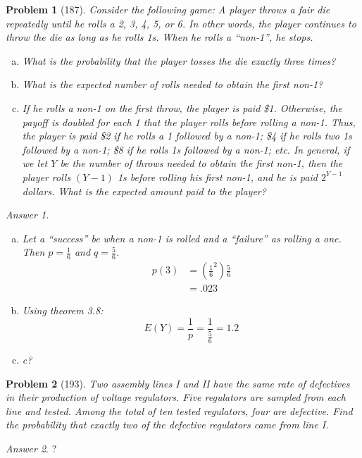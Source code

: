 \documentclass{article}
\theoremstyle{problem}
\newtheorem{prob}{Problem}
\theoremstyle{remark}
\newtheorem*{answer}{Answer}
\begin{document}
\begin{prob}[187]
Consider the following game: A player throws a fair die repeatedly until he rolls a 2, 3, 4, 5, or 6. In other words, the player continues to throw the die as long as he rolls 1s. When he rolls a ``non-1'', he stops.
\begin{enumerate}[a)]
\item What is the probability that the player tosses the die exactly three times?
\item What is the expected number of rolls needed to obtain the first non-1?
\item If he rolls a non-1 on the first throw, the player is paid \$1. Otherwise, the payoff is doubled for each 1 that the player rolls before rolling a non-1. Thus, the player is paid \$2 if he rolls a 1 followed by a non-1; \$4 if he rolls two 1s followed by a non-1; \$8 if he rolls 1s followed by a non-1; etc. In general, if we let $Y$ be the number of throws needed to obtain the first non-1, then the player rolls $(Y - 1)$ 1s before rolling his first non-1, and he is paid $2^{Y-1}$ dollars. What is the expected amount paid to the player?
\end{enumerate}
\begin{answer}
\begin{enumerate}[a)]
  \item Let a ``success'' be when a non-1 is rolled and a ``failure'' as rolling a one. Then $p = \frac{1}{6}$ and $q = \frac{5}{6}$.
    \begin{align*}
      p(3) &= \left(\frac{1}{6}^2 \right) \frac{5}{6}\\
      &= .023
    \end{align*}
  \item Using theorem 3.8:
    $$
    E(Y) = \frac{1}{p} = \frac{1}{\frac{5}{6}} = 1.2
    $$
  \item c?
\end{enumerate}
\end{answer}
\end{prob}
%

\begin{prob}[193]
Two assembly lines I and II have the same rate of defectives in their production of voltage regulators. Five regulators are sampled from each line and tested. Among the total of ten tested regulators, four are defective. Find the probability that exactly two of the defective regulators came from line I.
\end{prob}
%
\begin{answer}
?
\end{answer}
\end{document}
